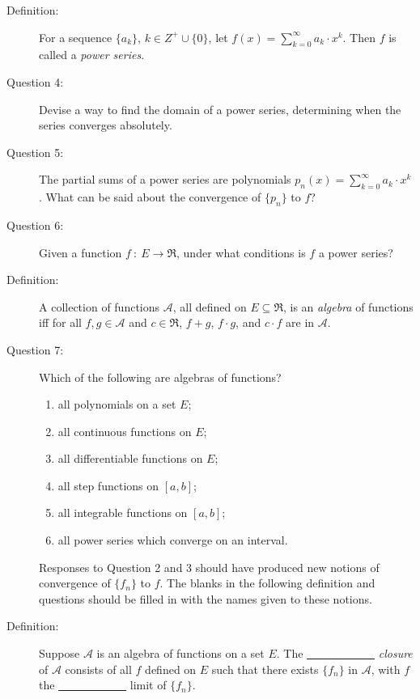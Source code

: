 \documentclass{article}
\begin{document}
\begin{description}
  \item[Definition:] For a sequence $\{ a_k \}$, $k \in Z^+ \cup \{ 0 \}$, let $\displaystyle f(x) = \sum_{k=0}^\infty a_k \cdot x^k$. Then $f$ is called a \emph{power series}.

  \item[Question 4:] Devise a way to find the domain of a power series, determining when the series converges absolutely.

  \item[Question 5:] The partial sums of a power series are polynomials $\displaystyle p_n(x) = \sum_{k=0}^\infty a_k \cdot x^k$. What can be said about the convergence of $\{ p_n \}$ to $f$?

  \item[Question 6:] Given a function $f\ :\ E \to \Re$, under what conditions is $f$ a power series?

  \item[Definition:] A collection of functions $\mathcal{A}$, all defined on $E \subseteq \Re$, is an \emph{algebra} of functions iff for all $f,g \in \mathcal{A}$ and $c \in \Re$, $f+g$, $f \cdot g$, and $c \cdot f$ are in $\mathcal{A}$.

  \item[Question 7:] Which of the following are algebras of functions?
    \begin{enumerate}[\hspace{1cm}(1)]
      \item all polynomials on a set $E$;
      \item all continuous functions on $E$;
      \item all differentiable functions on $E$;
      \item all step functions on $[a,b]$;
      \item all integrable functions on $[a,b]$;
      \item all power series which converge on an interval.
    \end{enumerate}

  \item[] Responses to Question 2 and 3 should have produced new notions of convergence of $\{ f_n \}$ to $f$. The blanks in the following definition and questions should be filled in with the names given to these notions.

  \item[Definition:] Suppose $\mathcal{A}$ is an algebra of functions on a set $E$. The \underline{\ \ \ \ \ \ \ \ \ \ \ \ } \emph{closure} of $\mathcal{A}$ consists of all $f$ defined on $E$ such that there exists $\{ f_n \}$ in $\mathcal{A}$, with $f$ the \underline{\ \ \ \ \ \ \ \ \ \ \ \ } limit of $\{ f_n \}$.


\end{description}
\end{document}
